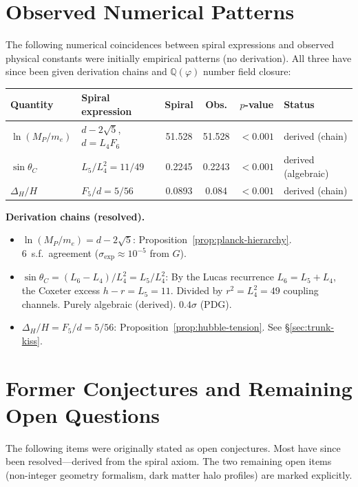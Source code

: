 \documentclass[12pt,a4paper]{article}
\begin{document}
\section{Observed Numerical Patterns}
\label{sec:num-patterns}

The following numerical coincidences between spiral expressions and observed physical constants were initially empirical patterns (no derivation). All three have since been given derivation chains and $\mathbb{Q}(\varphi)$ number field closure:

\begin{center}
\small
\begin{tabular}{|l|l|c|c|c|l|}
\hline
\textbf{Quantity} & \textbf{Spiral expression} & \textbf{Spiral} & \textbf{Obs.} & \textbf{$p$-value} & \textbf{Status} \\
\hline
$\ln(M_P/m_e)$ & $d - 2\sqrt{5}$, $d = L_4 F_6$ & 51.528 & 51.528 & $< 0.001$ & derived (chain) \\
$\sin\theta_C$ & $L_5/L_4^2 = 11/49$ & 0.2245 & 0.2243 & $< 0.001$ & derived (algebraic) \\
$\Delta_H / H$ & $F_5/d = 5/56$ & 0.0893 & 0.084 & $< 0.001$ & derived (chain) \\
\hline
\end{tabular}
\end{center}

\noindent\textbf{Derivation chains (resolved).}
\begin{itemize}[nosep]
\item $\ln(M_P/m_e) = d - 2\sqrt{5}$: Proposition~\ref{prop:planck-hierarchy}. 6~s.f.\ agreement ($\sigma_{\mathrm{exp}} \approx 10^{-5}$ from $G$).
\item $\sin\theta_C = (L_6{-}L_4)/L_4^2 = L_5/L_4^2$: By the Lucas recurrence $L_6 = L_5 + L_4$, the Coxeter excess $h - r = L_5 = 11$. Divided by $r^2 = L_4^2 = 49$ coupling channels. Purely algebraic (derived). $0.4\sigma$ (PDG).
\item $\Delta_H/H = F_5/d = 5/56$: Proposition~\ref{prop:hubble-tension}. See \S\ref{sec:trunk-kiss}.
\end{itemize}


\section{Former Conjectures and Remaining Open Questions}
\label{sec:open-questions}

The following items were originally stated as open conjectures. Most have since been resolved---derived from the spiral axiom. The two remaining open items (non-integer geometry formalism, dark matter halo profiles) are marked explicitly.
\end{document}

